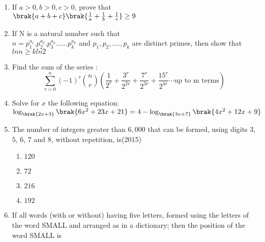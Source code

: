 \begin{enumerate}[label=\thesubsection.\arabic*,ref=\thesubsection.\theenumi]
\begin{multicols}{2}
\begin{multicols}{4}
\begin{enumerate}
        \item an integer
        \item a rational number
        \item an irrational number
        \item A prime number
    \end{enumerate}
\end{multicols}
    \end{multicols}
    \item If $a>0, b>0, c>0$,  prove that
    \\
    $\brak{a+b+c}\brak{\frac{1}{a}+\frac{1}{b}+\frac{1}{c}}\geq9$
    \hfill{}
%
    \item If N is a natural number such that
\\ 
$n= p_{1}^{a_1}.p_{2}^{a_2}.p_{3}^{a_3}......p_{k}^{a_k} $ and $ p_{1}, p_{2}, ...., p_{k} $ are distinct primes,  then show that $ ln n \geq k ln2 $                              
%     
		\hfill {}              
%
	\item Find the sum of the series :\[
\sum_{r=0}^{n} (-1)^r \binom{n}{r} \left( \frac{1}{2^r} + \frac{3^r}{2^{2r}} + \frac{7^r}{2^{3r}} + \frac{15^r}{2^{4r}}  \cdots \text{up to m terms} \right)
\]
%
%
%
%	    
%	    
	    \hfill {}
     \item Solve for $x$ the following equation:     
%     
	     \hfill {}          \\              
		     $   \log_{\brak{2x+3}}{\brak{6x^{2}+23x+21}}=4-\log_{\brak{3x+7}}{\brak{4x^{2}+12x+9}} $
%
\item The number of integers greater than $6, 000$ that can be formed,  using digits $3$, $5$, $6$, $7$ and $8$,  without repetition,  is\hfill{(2015)}
    \begin{multicols}{4}
\begin{enumerate}    
    \item $120$ 
    \item $72$
    \item $216$
    \item $192$ 
    \end{enumerate}
\end{multicols} 
%    
	    \item If all words (with or without) having five letters, formed using the letters of the word SMALL and arranged as in a dictionary; then the position of the word SMALL is 


\end{enumerate}
